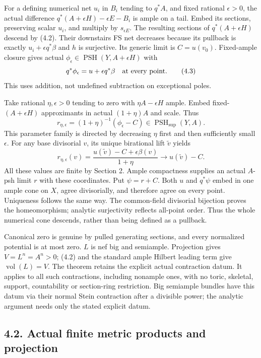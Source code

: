 \documentclass[
  10pt,
]{article}
\begin{document}
For a defining numerical net \(u_i\) in \(B_i\) tending to \(q^*A\), and
fixed rational \(\epsilon>0\), the actual difference
\(q^*(A+\epsilon H)-\epsilon E-B_i\) is ample on a tail. Embed its
sections, preserving scalar \(u_i\), and multiply by \(s_{\epsilon E}\).
The resulting sections of \(q^*(A+\epsilon H)\) descend by (4.2). Their
downstairs FS net decreases because its pullback is exactly
\(u_i+\epsilon q^*\beta\) and \(h\) is surjective. Its generic limit is
\(C=u(v_0)\). Fixed-ample closure gives actual
\(\phi_\epsilon\in\operatorname{PSH}(Y,A+\epsilon H)\) with
\[q^*\phi_\epsilon=u+\epsilon q^*\beta\quad\hbox{at every point}. \tag{4.3}\]
This uses addition, not undefined subtraction on exceptional poles.

Take rational \(\eta,\epsilon>0\) tending to zero with
\(\eta A-\epsilon H\) ample. Embed fixed-\((A+\epsilon H)\) approximants
in actual \((1+\eta)A\) and scale. Thus
\[r_{\eta,\epsilon}=(1+\eta)^{-1}(\phi_\epsilon-C)
\in\operatorname{PSH}_{\sup}(Y,A).\] This parameter family is directed
by decreasing \(\eta\) first and then sufficiently small \(\epsilon\).
For any base divisorial \(v\), its unique birational lift
\(\widetilde v\) yields \[r_{\eta,\epsilon}(v)=
\frac{u(\widetilde v)-C+\epsilon\beta(v)}{1+\eta}
\longrightarrow u(\widetilde v)-C.\] All these values are finite by
Section 2. Ample compactness supplies an actual \(A\)-psh limit \(r\)
with these coordinates. Put \(\psi=r+C\). Both \(u\) and \(q^*\psi\)
embed in one ample cone on \(X\), agree divisorially, and therefore
agree on every point. Uniqueness follows the same way. The common-field
divisorial bijection proves the homeomorphism; analytic surjectivity
reflects all-point order. Thus the whole numerical cone descends, rather
than being defined as a pullback.

Canonical zero is genuine by pulled generating sections, and every
normalized potential is at most zero. \(L\) is nef big and semiample.
Projection gives \(V=L^n=A^n>0\); (4.2) and the standard ample Hilbert
leading term give \(\operatorname{vol}(L)=V\). The theorem retains the
explicit actual contraction datum. It applies to all such contractions,
including nonample ones, with no toric, skeletal, support, countability
or section-ring restriction. Big semiample bundles have this datum via
their normal Stein contraction after a divisible power; the analytic
argument needs only the stated explicit datum.

\subsection{4.2. Actual finite metric products and
projection}\label{actual-finite-metric-products-and-projection}
\end{document}
